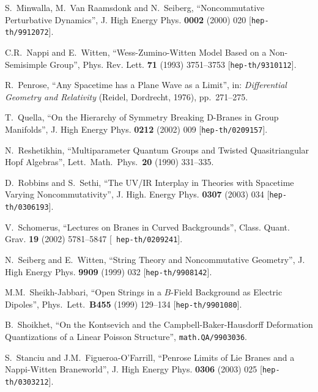 \documentclass[11pt,a4paper]{article}
\newcommand{\1}{\mathbb{1}}
\begin{document}
\begin{thebibliography}{99}
  S.~Minwalla, M.~Van Raamsdonk and N.~Seiberg,
  ``Noncommutative Perturbative Dynamics'',
  J. High Energy Phys. {\bf 0002} (2000) 020
  [{\tt hep-th/9912072}].

 C.R.~Nappi and E.~Witten, ``Wess-Zumino-Witten Model Based on a
  Non-Semisimple Group'', Phys. Rev. Lett. {\bf 71} (1993) 3751--3753
  [{\tt hep-th/9310112}].

 R.~Penrose, ``Any Spacetime has a Plane Wave as a
  Limit'', in: {\it Differential Geometry and Relativity} (Reidel,
  Dordrecht, 1976), pp.~271--275.

 T.~Quella, ``On the Hierarchy of Symmetry Breaking
  D-Branes in Group Manifolds'', J. High Energy Phys. {\bf 0212}
  (2002) 009 [{\tt hep-th/0209157}].

  N.~Reshetikhin,
  ``Multiparameter Quantum Groups and Twisted Quasitriangular Hopf Algebras'',
  Lett.\ Math.\ Phys.\  {\bf 20} (1990) 331--335.

 D.~Robbins and S.~Sethi, ``The UV/IR Interplay in
  Theories with Spacetime Varying Noncommutativity'', J. High. Energy
  Phys. {\bf 0307} (2003) 034 [{\tt hep-th/0306193}].

 V.~Schomerus, ``Lectures on Branes in Curved
  Backgrounds'', Class. Quant. Grav. {\bf 19} (2002) 5781--5847 [{\tt
  hep-th/0209241}].

 N.~Seiberg and E.~Witten, ``String Theory and
  Noncommutative Geometry'', J. High Energy Phys. {\bf 9909} (1999)
  032 [{\tt hep-th/9908142}].

  M.M.~Sheikh-Jabbari,
  ``Open Strings in a $B$-Field Background as Electric Dipoles'',
  Phys.\ Lett.\  {\bf B455} (1999) 129--134
  [{\tt hep-th/9901080}].

 B.~Shoikhet, ``On the Kontsevich and the
  Campbell-Baker-Hausdorff Deformation Quantizations of a Linear
  Poisson Structure'', {\tt math.QA/9903036}.

 S.~Stanciu and J.M.~Figueroa-O'Farrill, ``Penrose Limits
  of Lie Branes and a Nappi-Witten Braneworld'', J. High Energy
  Phys. {\bf 0306} (2003) 025 [{\tt hep-th/0303212}].


\end{thebibliography}
\end{document}
